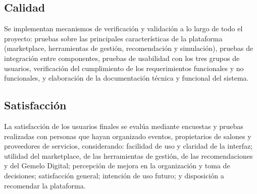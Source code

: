 \subsection{Calidad}

Se implementan mecanismos de verificación y validación a lo largo de todo
el proyecto: pruebas sobre las principales características de la
plataforma (marketplace, herramientas de gestión, recomendación y
simulación), pruebas de integración entre componentes, pruebas de
usabilidad con los tres grupos de usuarios, verificación del cumplimiento
de los requerimientos funcionales y no funcionales, y elaboración de la
documentación técnica y funcional del sistema.

\subsection{Satisfacción}

La satisfacción de los usuarios finales se evalúa mediante encuestas y
pruebas realizadas con personas que hayan organizado eventos, propietarios
de salones y proveedores de servicios, considerando: facilidad de uso y
claridad de la interfaz; utilidad del marketplace, de las herramientas de
gestión, de las recomendaciones y del Gemelo Digital; percepción de
mejora en la organización y toma de decisiones; satisfacción general;
intención de uso futuro; y disposición a recomendar la plataforma.
